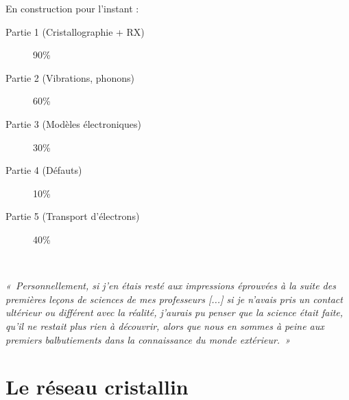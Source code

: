 \documentclass[a4paper,justified,twoside,nobib]{tufte-book}
\renewcommand{\=}[1]{\stackrel{#1}{=}} %
\begin{document}
    \vspace{2cm}
    
En construction pour l'instant :
\begin{description}
    \item[Partie 1 (Cristallographie + RX)] 90\%
    \item[Partie 2 (Vibrations, phonons)] 60\%
    \item[Partie 3 (Modèles électroniques)] 30\%
    \item[Partie 4 (Défauts)] 10\%
    \item[Partie 5 (Transport d'électrons)] 40\%
\end{description}




\tableofcontents\thispagestyle{empty}



\cleardoublepage
~\vfill
\begin{doublespace}
\noindent\fontsize{18
}{22}\selectfont\itshape
\nohyphenation
«~Personnellement, si j'en étais resté aux impressions éprouvées à la suite des 
premières leçons de sciences de mes professeurs [...] si je n'avais pris un
contact ultérieur ou différent avec la réalité, j'aurais pu penser que la 
science était faite, qu'il ne restait plus rien à découvrir, alors que nous en 
sommes à peine aux premiers balbutiements dans la connaissance du monde 
extérieur.~»\\

\end{doublespace}
\vfill
\vfill

\mainmatter

\part[LE RÉSEAU CRISTALLIN]{Le réseau cristallin}
\end{document}
